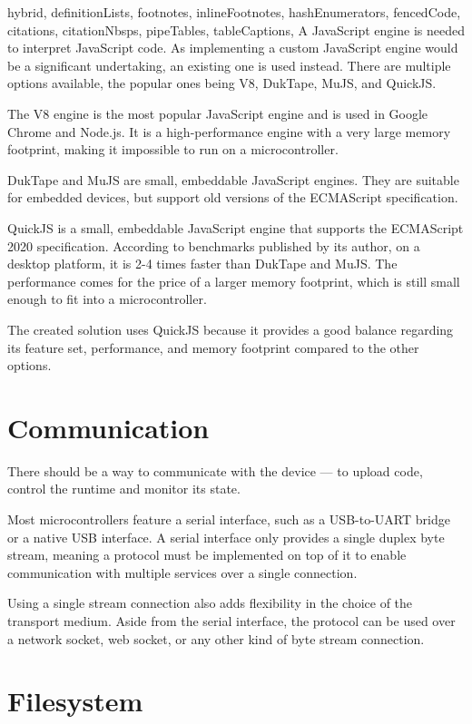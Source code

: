 \begin{markdown*}{%
  hybrid,
  definitionLists,
  footnotes,
  inlineFootnotes,
  hashEnumerators,
  fencedCode,
  citations,
  citationNbsps,
  pipeTables,
  tableCaptions,
}
A JavaScript engine is needed to interpret JavaScript code. As implementing a custom JavaScript engine would be a significant undertaking, an existing one is used instead. There are multiple options available, the popular ones being V8\cite{v8}, DukTape\cite{duktape}, MuJS\cite{mujs}, and QuickJS\cite{quickjs}.

The V8 engine is the most popular JavaScript engine and is used in Google Chrome and Node.js. It is a high-performance engine with a very large memory footprint, making it impossible to run on a microcontroller.

DukTape and MuJS are small, embeddable JavaScript engines. They are suitable for embedded devices, but support old versions of the ECMAScript specification.

QuickJS is a small, embeddable JavaScript engine that supports the ECMAScript 2020 specification. According to benchmarks published by its author\cite{quickjs-bench}, on a desktop platform, it is 2-4 times faster than DukTape and MuJS. The performance comes for the price of a larger memory footprint, which is still small enough to fit into a microcontroller.

The created solution uses QuickJS because it provides a good balance regarding its feature set, performance, and memory footprint compared to the other options.

\section{Communication}

There should be a way to communicate with the device --- to upload code, control the runtime and monitor its state.

Most microcontrollers feature a serial interface, such as a USB-to-UART bridge or a native USB interface. A serial interface only provides a single duplex byte stream, meaning a protocol must be implemented on top of it to enable communication with multiple services over a single connection.

Using a single stream connection also adds flexibility in the choice of the transport medium. Aside from the serial interface, the protocol can be used over a network socket, web socket, or any other kind of byte stream connection.

\section{Filesystem}


\end{markdown*}
